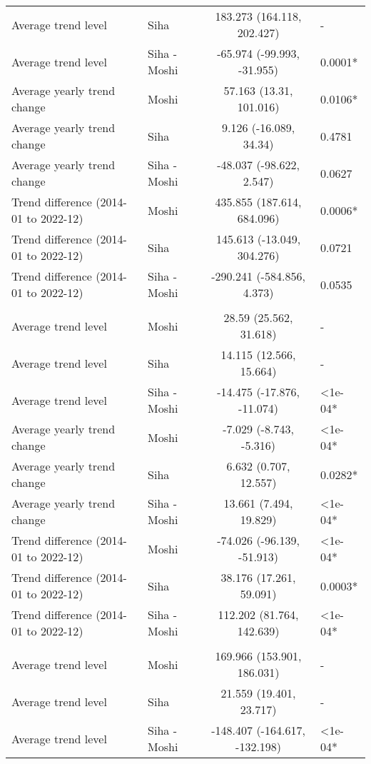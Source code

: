 \begin{longtable}{l|lcl}
Average trend level & Siha & 183.273 (164.118, 202.427) & - \\ 
Average trend level & Siha - Moshi & -65.974 (-99.993, -31.955) & 0.0001* \\ 
Average yearly trend change & Moshi & 57.163 (13.31, 101.016) & 0.0106* \\ 
Average yearly trend change & Siha & 9.126 (-16.089, 34.34) & 0.4781 \\ 
Average yearly trend change & Siha - Moshi & -48.037 (-98.622, 2.547) & 0.0627 \\ 
Trend difference (2014-01 to 2022-12) & Moshi & 435.855 (187.614, 684.096) & 0.0006* \\ 
Trend difference (2014-01 to 2022-12) & Siha & 145.613 (-13.049, 304.276) & 0.0721 \\ 
Trend difference (2014-01 to 2022-12) & Siha - Moshi & -290.241 (-584.856, 4.373) & 0.0535 \\ 
\midrule\addlinespace[2.5pt]
\multicolumn{4}{l}{Poisoning} \\ 
\midrule\addlinespace[2.5pt]
Average trend level & Moshi & 28.59 (25.562, 31.618) & - \\ 
Average trend level & Siha & 14.115 (12.566, 15.664) & - \\ 
Average trend level & Siha - Moshi & -14.475 (-17.876, -11.074) & <1e-04* \\ 
Average yearly trend change & Moshi & -7.029 (-8.743, -5.316) & <1e-04* \\ 
Average yearly trend change & Siha & 6.632 (0.707, 12.557) & 0.0282* \\ 
Average yearly trend change & Siha - Moshi & 13.661 (7.494, 19.829) & <1e-04* \\ 
Trend difference (2014-01 to 2022-12) & Moshi & -74.026 (-96.139, -51.913) & <1e-04* \\ 
Trend difference (2014-01 to 2022-12) & Siha & 38.176 (17.261, 59.091) & 0.0003* \\ 
Trend difference (2014-01 to 2022-12) & Siha - Moshi & 112.202 (81.764, 142.639) & <1e-04* \\ 
\midrule\addlinespace[2.5pt]
\multicolumn{4}{l}{Psychoses} \\ 
\midrule\addlinespace[2.5pt]
Average trend level & Moshi & 169.966 (153.901, 186.031) & - \\ 
Average trend level & Siha & 21.559 (19.401, 23.717) & - \\ 
Average trend level & Siha - Moshi & -148.407 (-164.617, -132.198) & <1e-04* \\ 

\end{longtable}
